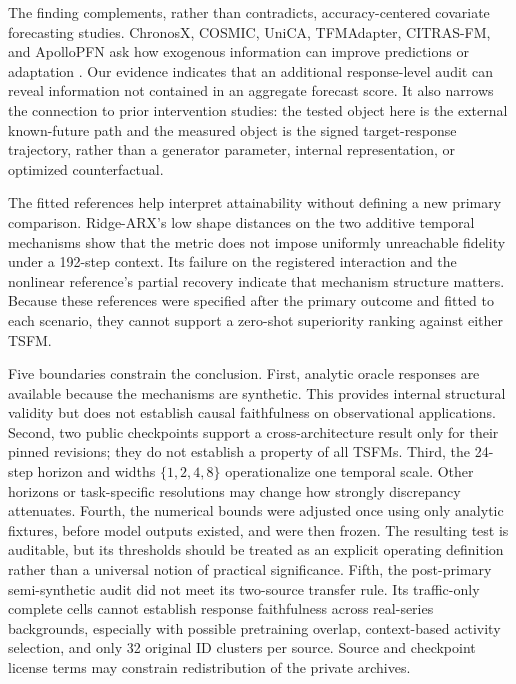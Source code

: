 \documentclass[conference]{IEEEtran}
\begin{document}
The finding complements, rather than contradicts, accuracy-centered covariate
forecasting studies. ChronosX, COSMIC, UniCA, TFMAdapter, CITRAS-FM, and ApolloPFN ask
how exogenous information can improve predictions or adaptation
\cite{arango2025chronosx,auer2025cosmic,han2025unica,dange2025tfmadapter,
yamaguchi2026citrasfm,potapczynski2026apollopfn}. Our evidence indicates that an
additional response-level audit can reveal information not contained in an aggregate
forecast score. It also narrows the connection to prior intervention studies: the
tested object here is the external known-future path and the measured object is the
signed target-response trajectory, rather than a generator parameter, internal
representation, or optimized counterfactual.

The fitted references help interpret attainability without defining a new primary
comparison. Ridge-ARX's low shape distances on the two additive temporal mechanisms
show that the metric does not impose uniformly unreachable fidelity under a 192-step
context. Its failure on the registered interaction and the nonlinear reference's
partial recovery indicate that mechanism structure matters. Because these references
were specified after the primary outcome and fitted to each scenario, they cannot
support a zero-shot superiority ranking against either TSFM.

Five boundaries constrain the conclusion. First, analytic oracle responses are
available because the mechanisms are synthetic. This provides internal structural
validity but does not establish causal faithfulness on observational applications.
Second, two public checkpoints support a cross-architecture result only for their
pinned revisions; they do not establish a property of all TSFMs. Third, the 24-step
horizon and widths $\{1,2,4,8\}$ operationalize one temporal scale. Other horizons or
task-specific resolutions may change how strongly discrepancy attenuates. Fourth, the numerical
bounds were adjusted once using only analytic fixtures, before model outputs existed,
and were then frozen. The resulting test is auditable, but its thresholds should be
treated as an explicit operating definition rather than a universal notion of
practical significance.
Fifth, the post-primary semi-synthetic audit did not meet its two-source
transfer rule. Its traffic-only complete cells cannot establish response
faithfulness across real-series backgrounds, especially with possible
pretraining overlap, context-based activity selection, and only 32 original
ID clusters per source. Source and checkpoint license terms may constrain
redistribution of the private archives.
\end{document}
